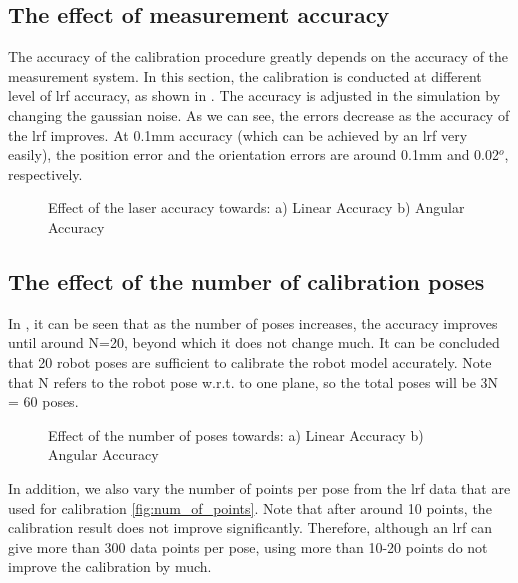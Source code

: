 \subsection{The effect of measurement accuracy}
\label{sec:meas_accuracy}
The accuracy of the calibration procedure greatly depends on the accuracy of the measurement system. In this section, the calibration is conducted at different level of \ac{lrf} accuracy, as shown in . The accuracy is adjusted in the simulation by changing the gaussian noise. As we can see, the errors decrease as the accuracy of the \ac{lrf} improves. At 0.1mm accuracy (which can be achieved by an \ac{lrf} very easily), the position error and the orientation errors are around 0.1mm and 0.02$^o$, respectively. 
\begin{figure}[h]
  \centering
  \;
  \caption{Effect of the laser accuracy towards: a) Linear Accuracy b) Angular Accuracy} 
  \label{fig:laser_accuracy}
\end{figure}


\subsection{The effect of the number of calibration poses}
\label{sec:calib_poses}
In , it can be seen that as the number of poses increases, the accuracy improves until around N=20, beyond which it does not change much. It can be concluded that 20 robot poses are sufficient to calibrate the robot model accurately. Note that N refers to the robot pose w.r.t. to one plane, so the total poses will be 3N = 60 poses. 

\begin{figure}[h]
  \centering
  \;
  \caption{Effect of the number of poses towards: a) Linear Accuracy b) Angular Accuracy} 
  \label{fig:num_of_poses}
\end{figure}

In addition, we also vary the number of points per pose from the \ac{lrf} data that are used for calibration \ref{fig:num_of_points}. Note that after around 10 points, the calibration result does not improve significantly. Therefore, although an \ac{lrf} can give more than 300 data points per pose, using more than 10-20 points do not improve the calibration by much. 

